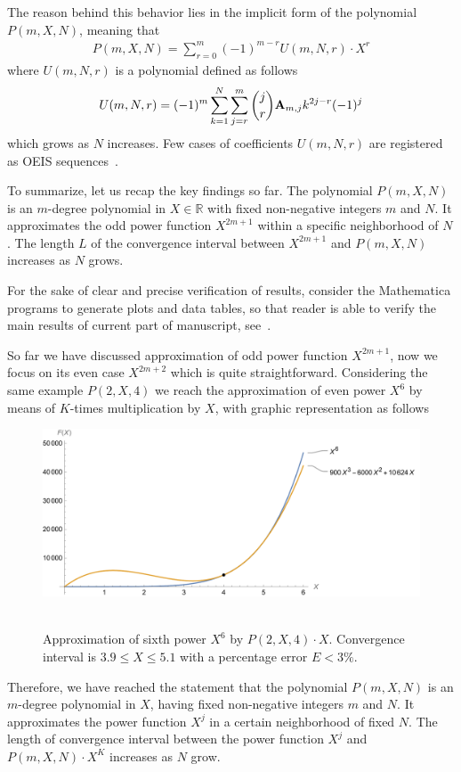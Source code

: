 The reason behind this behavior lies in the implicit form of the polynomial $P(m,X,N)$,
meaning that
\begin{align*}
    P(m,X,N) = \sum_{r=0}^{m} (-1)^{m-r} U(m, N, r) \cdot X^{r}
\end{align*}
where $U(m, N, r)$ is a polynomial defined as follows
\begin{align*}
    U(m, N, r) = (-1)^m \sum_{k=1}^{N} \sum_{j=r}^{m} \binom{j}{r} {\mathbf{A}} \sb{m,j} k^{2j-r} (-1)^j
\end{align*}
which grows as $N$ increases.
Few cases of coefficients $U(m, N, r)$ are registered as OEIS sequences~\cite{
    oeis_coefficients_u_m_l_k_defined_by_polynomial_identity_1,
    oeis_coefficients_u_m_l_k_defined_by_polynomial_identity_2,
    oeis_coefficients_u_m_l_k_defined_by_polynomial_identity_3}.

To summarize, let us recap the key findings so far.
The polynomial $P(m,X,N)$ is an $m$-degree polynomial in $X \in \mathbb{R}$ with fixed non-negative integers $m$ and $N$.
It approximates the odd power function $X^{2m+1}$ within a specific neighborhood of $N$.
The length $L$ of the convergence interval between $X^{2m+1}$ and $P(m,X,N)$ increases as $N$ grows.

For the sake of clear and precise verification of results, consider the Mathematica programs to generate
plots and data tables, so that reader is able to verify the main results of current part of manuscript,
see~\cite{kolosovpetro_gist}.

So far we have discussed approximation of odd power function $X^{2m+1}$, now we focus on its even case $X^{2m+2}$
which is quite straightforward.
Considering the same example $P(2, X, 4)$ we reach the approximation of even power $X^6$
by means of $K$-times multiplication by $X$, with graphic representation as follows
\begin{figure}[H]
    \centering
    \includegraphics[width=1\textwidth]{sections/images/07_plot_of_6th_power_with_p_2_4_times_x}
    ~\caption{Approximation of sixth power $X^6$ by $P(2, X, 4) \cdot X$.
    Convergence interval is $3.9 \leq X \leq 5.1$ with a percentage error $E < 3\%$.
    }\label{fig:07_plot_of_6th_power_with_p_2_4_times_x}
\end{figure}
Therefore, we have reached the statement that
the polynomial $P(m,X,N)$ is an $m$-degree polynomial in $X$, having fixed non-negative
integers $m$ and $N$.
It approximates the power function $X^{j}$ in a certain neighborhood of fixed $N$.
The length of convergence interval between the power function $X^j$ and $P(m,X,N) \cdot X^K$ increases as $N$ grow.
